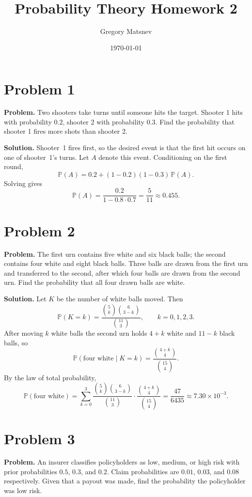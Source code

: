 \documentclass{article}
\title{Probability Theory Homework 2}
\author{Gregory Matsnev}
\date{\today}
\begin{document}
\maketitle

\section{Problem 1}

\textbf{Problem.} Two shooters take turns until someone hits the target. Shooter 1 hits with probability $0.2$, shooter 2 with probability $0.3$. Find the probability that shooter 1 fires more shots than shooter 2.

\textbf{Solution.} Shooter~1 fires first, so the desired event is that the first hit occurs on one of shooter~1's turns. Let $A$ denote this event. Conditioning on the first round,
\[
\mathbb{P}(A) = 0.2 + (1-0.2)(1-0.3)\,\mathbb{P}(A).
\]
Solving gives
\[
\mathbb{P}(A) = \frac{0.2}{1-0.8\cdot 0.7} = \frac{5}{11} \approx 0.455.
\]

\section{Problem 2}

\textbf{Problem.} The first urn contains five white and six black balls; the second contains four white and eight black balls. Three balls are drawn from the first urn and transferred to the second, after which four balls are drawn from the second urn. Find the probability that all four drawn balls are white.

\textbf{Solution.} Let $K$ be the number of white balls moved. Then
\[
\mathbb{P}(K=k) = \frac{\binom{5}{k}\binom{6}{3-k}}{\binom{11}{3}},\qquad k=0,1,2,3.
\]
After moving $k$ white balls the second urn holds $4+k$ white and $11-k$ black balls, so
\[
\mathbb{P}(\text{four white}\mid K=k)=\frac{\binom{4+k}{4}}{\binom{15}{4}}.
\]
By the law of total probability,
\[
\mathbb{P}(\text{four white}) = \sum_{k=0}^{3} \frac{\binom{5}{k}\binom{6}{3-k}}{\binom{11}{3}} \cdot \frac{\binom{4+k}{4}}{\binom{15}{4}} = \frac{47}{6435} \approx 7.30\times 10^{-3}.
\]

\section{Problem 3}

\textbf{Problem.} An insurer classifies policyholders as low, medium, or high risk with prior probabilities $0.5$, $0.3$, and $0.2$. Claim probabilities are $0.01$, $0.03$, and $0.08$ respectively. Given that a payout was made, find the probability the policyholder was low risk.
\end{document}
